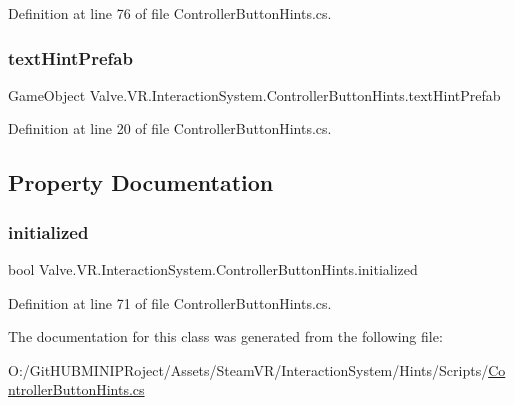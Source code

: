 Definition at line 76 of file Controller\+Button\+Hints.\+cs.

\mbox{\label{class_valve_1_1_v_r_1_1_interaction_system_1_1_controller_button_hints_ac3205beda1e8ea9bb2869b48d82039a5}} 
\subsubsection{\texorpdfstring{textHintPrefab}{textHintPrefab}}
{\footnotesize\ttfamily Game\+Object Valve.\+V\+R.\+Interaction\+System.\+Controller\+Button\+Hints.\+text\+Hint\+Prefab}



Definition at line 20 of file Controller\+Button\+Hints.\+cs.



\subsection{Property Documentation}
\mbox{\label{class_valve_1_1_v_r_1_1_interaction_system_1_1_controller_button_hints_a5d3509127dd1aac8bb1df1245861508f}} 
\subsubsection{\texorpdfstring{initialized}{initialized}}
{\footnotesize\ttfamily bool Valve.\+V\+R.\+Interaction\+System.\+Controller\+Button\+Hints.\+initialized\hspace{0.3cm}{\ttfamily [get]}}



Definition at line 71 of file Controller\+Button\+Hints.\+cs.



The documentation for this class was generated from the following file\+:\begin{DoxyCompactItemize}
\item 
O\+:/\+Git\+H\+U\+B\+M\+I\+N\+I\+P\+Roject/\+Assets/\+Steam\+V\+R/\+Interaction\+System/\+Hints/\+Scripts/\mbox{\hyperlink{_controller_button_hints_8cs}{Controller\+Button\+Hints.\+cs}}\end{DoxyCompactItemize}
